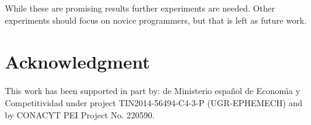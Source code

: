 \documentclass[a4paper,twoside]{article}
\begin{document}
While these are promising results further experiments are needed. Other experiments
should focus on novice programmers, but that is left as future
work. %

\section*{Acknowledgment}
This work has been supported in part by: de Ministerio espa\~{n}ol de Econom\'{\i}a y Competitividad under project TIN2014-56494-C4-3-P (UGR-EPHEMECH) and by CONACYT PEI Project No. 220590.




\vfill
\end{document}
